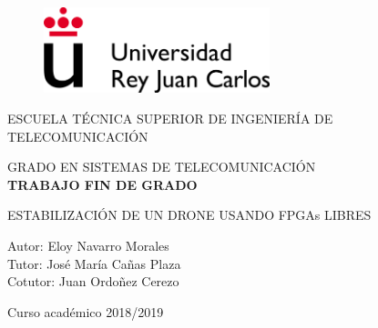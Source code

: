 
\thispagestyle{empty} %
\vspace*{5mm}
\begin{center}
\begin{figure}[h]
	\centering
		\includegraphics[height=25mm, width = 65.64mm]{Imagenes/escudouna.pdf}
	\label{fig:escudouna}
\end{figure}
\vspace{10pt}
\begin{spacing}{1.25}
	\Large ESCUELA TÉCNICA SUPERIOR DE INGENIERÍA DE TELECOMUNICACIÓN\\
\end{spacing}
\vspace{18pt}
\Large GRADO EN SISTEMAS DE TELECOMUNICACIÓN\\
\vspace{48pt}
\textbf{TRABAJO FIN DE GRADO}
\vspace{48pt}
\begin{spacing}{1.25}
	\LARGE ESTABILIZACIÓN DE UN DRONE USANDO FPGAs LIBRES\\
	\vspace{48pt}
\end{spacing}

Autor: Eloy Navarro Morales\\
Tutor: José María Cañas Plaza\\
Cotutor: Juan Ordoñez Cerezo\\

\vspace{24pt} %

\large Curso académico 2018/2019
\end{center}
